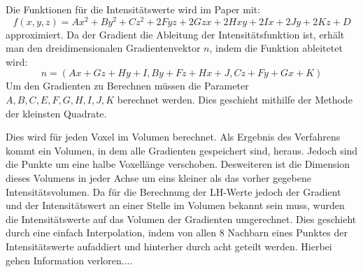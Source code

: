 Die Funktionen für die Intensitätswerte wird im Paper mit:
\begin{equation}
	f(x,y,z) = Ax^{2}+By^{2}+Cz^{2}+2Fyz+2Gzx+2Hxy+2Ix+2Jy+2Kz+D
\end{equation}
approximiert. Da der Gradient die Ableitung der Intensitätsfunktion ist, erhält man den dreidimensionalen Gradientenvektor $n$, indem die Funktion ableitetet wird:
\begin{equation}
	n = (Ax+Gz+Hy+I, By+Fz+Hx+J, Cz + Fy + Gx + K)
\end{equation}
Um den Gradienten zu Berechnen müssen die Parameter $A,B,C,E,F,G,H,I,J,K$  berechnet werden. Dies geschieht mithilfe der Methode der kleinsten Quadrate.

Dies wird für jeden Voxel im Volumen berechnet. Als Ergebnis des Verfahrens kommt ein Volumen, in dem alle Gradienten gespeichert sind, heraus. Jedoch sind die Punkte um eine halbe Voxellänge verschoben. Desweiteren ist die Dimension dieses Volumens in jeder Achse um eins kleiner als das vorher gegebene Intensitätsvolumen.
Da für die Berechnung der LH-Werte jedoch der Gradient und der Intensitätswert an einer Stelle im Volumen bekannt sein muss, wurden die Intensitätswerte auf das Volumen der Gradienten umgerechnet. Dies geschieht durch eine einfach Interpolation, indem von allen 8 Nachbarn eines Punktes der Intensitätswerte aufaddiert und hinterher durch acht geteilt werden. Hierbei gehen Information verloren....


